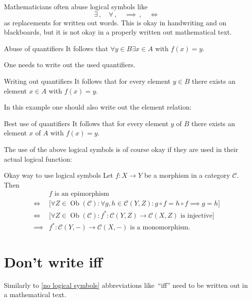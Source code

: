 Mathematicians often abuse logical symbols like
\[
  \exists \,,
  \quad
  \forall \,,
  \quad
  \implies \,,
  \quad
  \iff
\]
as replacements for written out words.
This is okay in handwriting and on blackboards, but it is not okay in a properly written out mathematical text.
\begin{showlatex}{Abuse of quantifiers}
It follows that $\forall y \in B \exists x \in A$ with $f(x) = y$.
\end{showlatex}
One needs to write out the used quantifiers.
\begin{showlatex}{Writing out quantifiers}
It follows that for every element $y \in B$ there exists an element $x \in A$ with $f(x) = y$.
\end{showlatex}
In this example one should also write out the element relation:
\begin{showlatex}{Best use of quantifiers}
It follows that for every element $y$ of $B$ there exists an element $x$ of $A$ with $f(x) = y$.
\end{showlatex}

The use of the above logical symbols is of course okay if they are used in their actual logical function:
\begin{showlatex}{Okay way to use logical symbols}
  Let $f \colon X \to Y$ be a morphism in a category $\mathcal{C}$.
  Then
  \begin{align*}
    {}&
      \text{$f$ is an epimorphism}
    \\
    \iff{}&
    \bigl[
    \forall Z \in \operatorname{Ob}(\mathcal{C}):
    \forall g, h \in \mathcal{C}(Y,Z):
    g \circ f = h \circ f \implies g = h
    \bigr]
    \\
    \iff{}&
    \bigl[
    \forall Z \in \operatorname{Ob}(\mathcal{C}):
    \text{$f^* \colon \mathcal{C}(Y,Z) \to \mathcal{C}(X,Z)$ is injective}
    \bigr]
    \\
    \implies{}&
    \text{$f^* \colon \mathcal{C}(Y,-) \to \mathcal{C}(X,-)$ is a monomorphism}.
  \end{align*}
\end{showlatex}





\section{Don’t write iff}
\label{no iff}

Similarly to \cref{no logical symbols} abbreviations like~\enquote{iff} need to be written out in a mathematical text.





